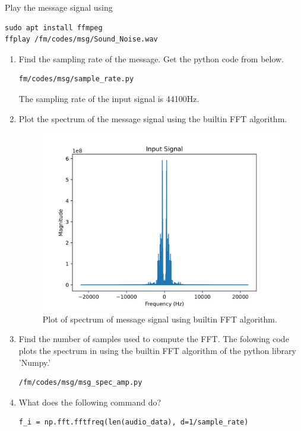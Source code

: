 Play the message signal using
\begin{lstlisting}
sudo apt install ffmpeg
ffplay /fm/codes/msg/Sound_Noise.wav
\end{lstlisting}
\begin{enumerate}[label=\arabic*.,ref=\thesection.\theenumi]
\item Find the sampling rate of the message.
	\solution
	Get the python code from below.
\begin{lstlisting}
fm/codes/msg/sample_rate.py
\end{lstlisting}
The sampling rate of the input signal is 44100Hz.
\item Plot the spectrum of the message signal using the builtin FFT algorithm.\\
	\solution		
\begin{figure}[H]
\centering
\includegraphics[width=\columnwidth]{fm/msg/figs/FFTbuiltin/inputs-1.png}
\caption{Plot of spectrum of message signal using builtin FFT algorithm.}
\label{fig:FFTb}
\end{figure}
\item Find the number of samples used to compute the FFT.
The folowing code plots the spectrum in  using the builtin FFT algorithm of the python library 'Numpy.'
\begin{lstlisting}
/fm/codes/msg/msg_spec_amp.py
\end{lstlisting}
\item What does the following command do?
\begin{lstlisting}
f_i = np.fft.fftfreq(len(audio_data), d=1/sample_rate)
\end{lstlisting}


\end{enumerate}

